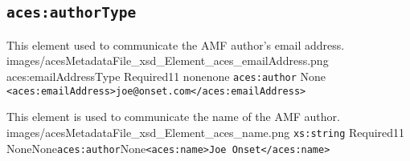 \subsection{\texttt{aces:authorType}}

        {This element used to communicate the AMF author's email address.}
        {images/acesMetadataFile_xsd_Element_aces_emailAddress.png}
        {aces:emailAddressType}
        {Required}{1}{1}
        {none}{none}
        {\texttt{aces:author}}
        {None}
        {\lstinline{<aces:emailAddress>joe@onset.com</aces:emailAddress>}}

        {This element is used to communicate the name of the AMF author.}
        {images/acesMetadataFile_xsd_Element_aces_name.png}
        {\texttt{xs:string}}
        {Required}{1}{1}
        {None}{None}{\texttt{aces:author}}{None}{\lstinline{<aces:name>Joe Onset</aces:name>}}
